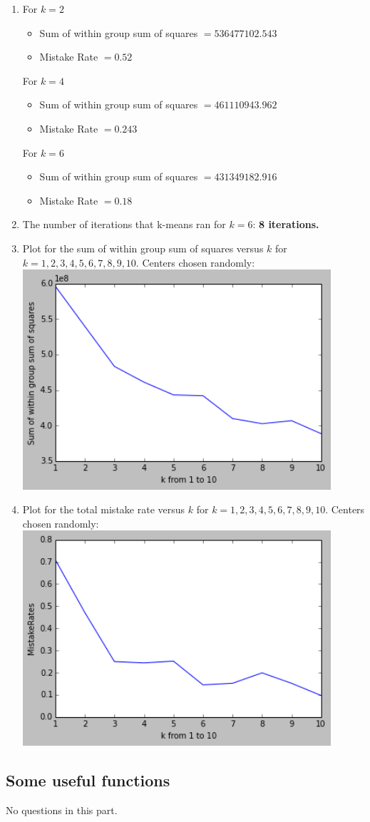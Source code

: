 \documentclass[letterpaper]{article}
\begin{document}
\begin{enumerate}
\item 
For $k=2$
\begin{itemize}
\item Sum of within group sum of squares $= 536477102.543$
\item Mistake Rate $= 0.52$
\end{itemize}
For $k=4$
\begin{itemize}
\item Sum of within group sum of squares $= 461110943.962$
\item Mistake Rate $= 0.243$
\end{itemize}
For $k=6$
\begin{itemize}
\item Sum of within group sum of squares $= 431349182.916$
\item Mistake Rate $= 0.18$
\end{itemize}
\item The number of iterations that k-means ran for $k = 6$: \textbf{8 iterations.}
\item Plot for the sum of within group sum of squares versus $k$ for
$k = 1, 2, 3, 4, 5, 6, 7, 8, 9, 10$. Centers chosen randomly:\\
\includegraphics[width = 4.5in, keepaspectratio]{sumVsK.png}
\item Plot for the total mistake rate versus $k$ for
$k = 1, 2, 3, 4, 5, 6, 7, 8, 9, 10$. Centers chosen randomly:\\
\includegraphics[width = 4.5in, keepaspectratio]{mrVsK.png}
\end{enumerate}

\subsection{Some useful functions}
No questions in this part.
\end{document}
